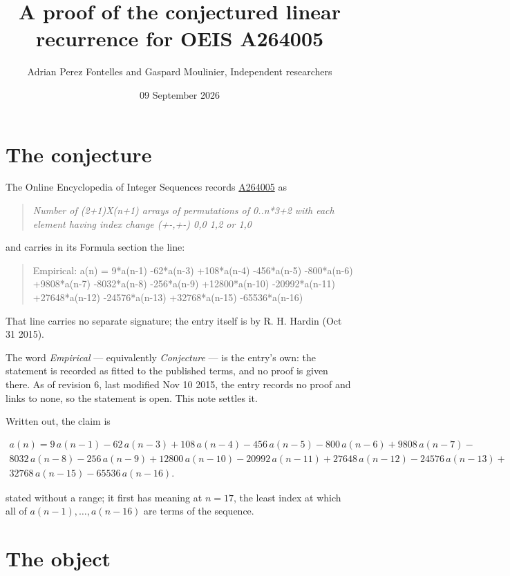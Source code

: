 \documentclass[11pt]{article}
\title{A proof of the conjectured linear recurrence for OEIS A264005}
\author{Adrian Perez Fontelles and Gaspard Moulinier, Independent researchers}
\date{09 September 2026}
\theoremstyle{definition}
\begin{document}
\maketitle
\section{The conjecture}

The Online Encyclopedia of Integer Sequences records \href{https://oeis.org/A264005}{A264005} as

\begin{quote}\itshape Number of (2+1)X(n+1) arrays of permutations of 0..n*3+2 with each element having index change (+-,+-) 0,0 1,2 or 1,0\end{quote}

and carries in its Formula section the line:

\begin{quote}\ttfamily Empirical: a(n) = 9*a(n-1) -62*a(n-3) +108*a(n-4) -456*a(n-5) -800*a(n-6) +9808*a(n-7) -8032*a(n-8) -256*a(n-9) +12800*a(n-10) -20992*a(n-11) +27648*a(n-12) -24576*a(n-13) +32768*a(n-15) -65536*a(n-16)\end{quote}

That line carries no separate signature; the entry itself is by R. H. Hardin (Oct 31 2015).

The word {\itshape Empirical} --- equivalently {\itshape Conjecture} --- is the entry's own: the statement is recorded as fitted to the published terms, and no proof is given there. As of revision 6, last modified Nov 10 2015, the entry records no proof and links to none, so the statement is open. This note settles it.

Written out, the claim is

\begin{multline*} a(n) = 9\,a(n-1) - 62\,a(n-3) + 108\,a(n-4) - 456\,a(n-5) - 800\,a(n-6) + 9808\,a(n-7) - \\ 8032\,a(n-8) - 256\,a(n-9) + 12800\,a(n-10) - 20992\,a(n-11) + 27648\,a(n-12) - 24576\,a(n-13) + \\ 32768\,a(n-15) - 65536\,a(n-16). \end{multline*}

stated without a range; it first has meaning at $n = 17$, the least index at which all of $a(n-1),\dots,a(n-16)$ are terms of the sequence.

\section{The object}
\end{document}
